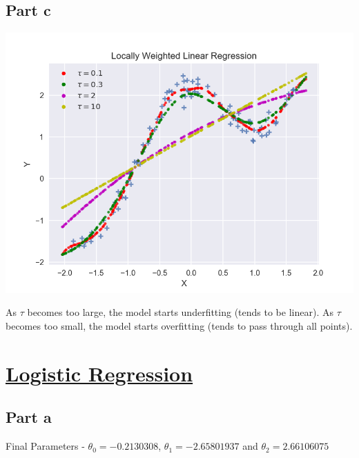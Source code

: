 \documentclass[12pt]{article}
\begin{document}
\subsection*{Part c}
\begin{center}
\includegraphics[scale=0.4]{localweight3.png}
\end{center}
\begin{addmargin}[0.3in]{0in}
As $\tau$ becomes too large, the model starts underfitting (tends to be linear). As $\tau$ becomes too small, the model starts overfitting (tends to pass through all points).
\end{addmargin}

\section*{\underline{Logistic Regression}}
\subsection*{Part a}
\begin{addmargin}[0.3in]{0in}
Final Parameters - $\theta_0 = -0.2130308$, $\theta_1 = -2.65801937$ and $\theta_2 = 2.66106075$
\end{addmargin}
\end{document}
